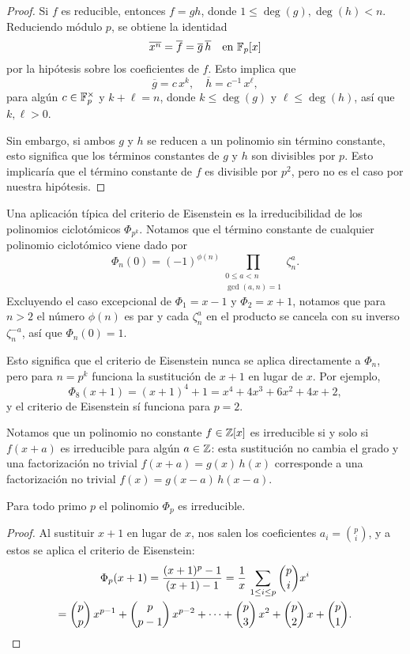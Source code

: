 \begin{proof}
  Si $f$ es reducible, entonces $f = gh$, donde $1 \le \deg (g), \deg (h) < n$.
  Reduciendo módulo $p$, se obtiene la identidad
  \[ \overline{x^n} = \overline{f} =
     \overline{g}\,\overline{h}\quad\text{en }\mathbb{F}_p [x] \]
  por la hipótesis sobre los coeficientes de $f$. Esto implica que
  $$\overline{g} = c\,x^k, \quad \overline{h} = c^{-1}\,x^\ell,$$
  para algún $c\in \mathbb{F}_p^\times$ y $k + \ell = n$, donde $k \le \deg (g)$ y $\ell
  \le \deg (h)$, así que $k,\ell > 0$.

  Sin embargo, si ambos $g$ y $h$ se reducen a un polinomio sin término
  constante, esto significa que los términos constantes de $g$ y $h$ son
  divisibles por $p$. Esto implicaría que el término constante de $f$ es
  divisible por $p^2$, pero no es el caso por nuestra hipótesis.
\end{proof}

Una aplicación típica del criterio de Eisenstein es la irreducibilidad de los
polinomios ciclotómicos $\Phi_{p^k}$. Notamos que el término constante de
cualquier polinomio ciclotómico viene dado por
\begin{equation}
  \label{eqn:termino-constante-de-Phi-n}
  \Phi_n (0) = (-1)^{\phi (n)} \prod_{\substack{0 \le a < n \\ \gcd (a,n) = 1}} \zeta_n^a.
\end{equation}
Excluyendo el caso excepcional de $\Phi_1 = x-1$ y $\Phi_2 = x+1$, notamos que
para $n > 2$ el número $\phi (n)$ es par y cada $\zeta_n^a$ en el producto se
cancela con su inverso $\zeta_n^{-a}$, así que $\Phi_n (0) = 1$.

Esto significa que el criterio de Eisenstein nunca se aplica directamente a
$\Phi_n$, pero para $n = p^k$ funciona la sustitución de $x+1$ en lugar de
$x$. Por ejemplo,
$$\Phi_8 (x+1) = (x+1)^4 + 1 = x^4 + 4x^3 + 6x^2 + 4x + 2,$$
y el criterio de Eisenstein sí funciona para $p = 2$.

Notamos que un polinomio no constante $f \in \mathbb{Z} [x]$ es irreducible si y solo
si $f (x + a)$ es irreducible para algún $a \in \mathbb{Z}$: esta sustitución no cambia
el grado y una factorización no trivial $f (x + a) = g (x)\,h(x)$ corresponde a
una factorización no trivial $f (x) = g (x-a)\,h (x-a)$.

\begin{proposicion}
  Para todo primo $p$ el polinomio $\Phi_p$ es irreducible.

  \begin{proof}
    Al sustituir $x+1$ en lugar de $x$, nos salen los coeficientes
    $a_i = {p\choose i}$, y a estos se aplica el criterio de Eisenstein:
    \begin{multline*}
      \Phi_p (x+1) = \frac{(x+1)^p - 1}{(x+1) - 1} = \frac{1}{x}\,\sum_{1 \le i \le p} {p\choose i} x^i \\
      = {p\choose p}\,x^{p-1} + {p\choose p-1}\,x^{p-2} + \cdots + {p\choose 3}\,x^2 + {p\choose 2}\,x + {p \choose 1}. \qedhere
    \end{multline*}
  \end{proof}
\end{proposicion}


